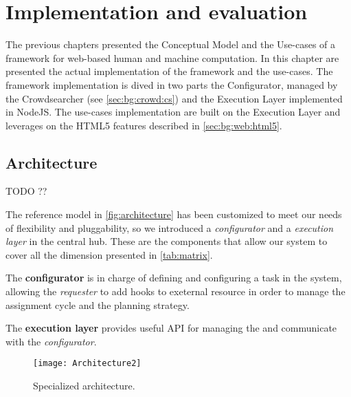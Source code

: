 \chapter{Implementation and evaluation}
\label{cap:implementation}

The previous chapters presented the Conceptual Model and the Use-cases of a
framework for web-based human and machine computation. In this chapter are
presented the actual implementation of the framework and the use-cases.
The framework implementation is dived in two parts the Configurator, managed by
the Crowdsearcher (see \autoref{sec:bg:crowd:cs}) and the Execution Layer
implemented in NodeJS.
The use-cases implementation are built on the Execution Layer and leverages on
the \ac{HTML}5 features described in \autoref{sec:bg:web:html5}.

\section{Architecture}
\label{sec:implementation:arch}








TODO ??

The reference model in \autoref{fig:architecture} has been customized to meet our
needs of flexibility and pluggability, so we introduced a \emph{configurator} and
a \emph{execution layer} in the central hub. These are the components that allow
our system to cover all the dimension presented in \autoref{tab:matrix}.

The \textbf{configurator} is in charge of defining and configuring a task in the
system, allowing the \emph{requester} to add hooks to exeternal resource in order
to manage the assignment cycle and the planning strategy.

The \textbf{execution layer} provides useful API for managing the \utask{} and
communicate with the \emph{configurator}.

\begin{figure}[tb]
    \centering
    \texttt{[image: Architecture2]}
    \caption{Specialized architecture.}
    \label{fig:architecture2}
\end{figure}





